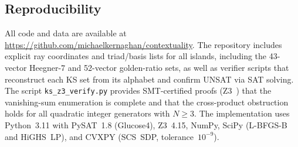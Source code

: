 \documentclass[12pt,a4paper]{article}
\begin{document}
\subsection*{Reproducibility}

\begin{sloppypar}
All code and data are available at
\url{https://github.com/michaelkernaghan/contextuality}.
The repository includes explicit ray coordinates and triad/basis lists for all islands, including the 43-vector Heegner-7 and 52-vector golden-ratio sets, as well as verifier scripts that reconstruct each KS set from its alphabet and confirm UNSAT via SAT solving. The script \texttt{ks\_z3\_verify.py} provides SMT-certified proofs (Z3~\cite{deMouraBjorner2008}) that the vanishing-sum enumeration is complete and that the cross-product obstruction holds for all quadratic integer generators with $N \geq 3$. The implementation uses Python~3.11 with PySAT~1.8 (Glucose4), Z3~4.15, NumPy, SciPy (L-BFGS-B and HiGHS~LP), and CVXPY (SCS~SDP, tolerance~$10^{-9}$).
\end{sloppypar}
\end{document}
